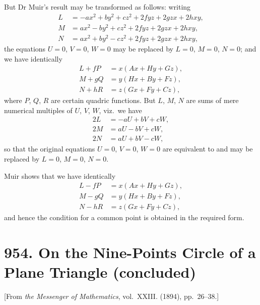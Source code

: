 \documentclass[11pt,a4paper]{book}
\begin{document}
{{{But Dr Muir's result may be transformed as follows: writing
\begin{align*}
L &= -ax^2 + by^2 + cz^2 + 2fyz + 2gzx + 2hxy, \\
M &= ax^2 - by^2 + cz^2 + 2fyz + 2gzx + 2hxy, \\
N &= ax^2 + by^2 - cz^2 + 2fyz + 2gzx + 2hxy,
\end{align*}
the equations $U = 0$, $V = 0$, $W = 0$ may be replaced by $L = 0$, $M = 0$, $N = 0$; and we have identically
\begin{align*}
L + fP &= x(Ax + Hy + Gz), \\
M + gQ &= y(Hx + By + Fz), \\
N + hR &= z(Gx + Fy + Cz),
\end{align*}
where $P$, $Q$, $R$ are certain quadric functions. But $L$, $M$, $N$ are sums of mere numerical multiples of $U$, $V$, $W$, viz.~we have
\begin{align*}
2L &= -aU + bV + cW, \\
2M &= aU - bV + cW, \\
2N &= aU + bV - cW,
\end{align*}
so that the original equations $U = 0$, $V = 0$, $W = 0$ are equivalent to and may be replaced by $L = 0$, $M = 0$, $N = 0$.

Muir shows that we have identically
\begin{align*}
L - fP &= x(Ax + Hy + Gz), \\
M - gQ &= y(Hx + By + Fz), \\
N - hR &= z(Gx + Fy + Cz),
\end{align*}
and hence the condition for a common point is obtained in the required form.

\newpage
\clearpage


\thispagestyle{fancy}


\newpage

\section{954. On the Nine-Points Circle of a Plane Triangle (concluded)}
\label{sec:954}

[From \textit{the Messenger of Mathematics}, vol.~XXIII. (1894), pp.~26--38.]
\bigskip

}}}
\end{document}

